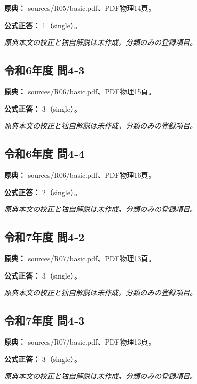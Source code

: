 \noindent\textbf{原典：} sources/R05/basic.pdf、PDF物理14頁。

\textbf{公式正答：} 1（single）。

\par\textit{原典本文の校正と独自解説は未作成。分類のみの登録項目。}

\subsection{令和6年度 問4-3}
\label{q:r06-reg-basic-4-3}

\noindent\textbf{原典：} sources/R06/basic.pdf、PDF物理15頁。

\textbf{公式正答：} 3（single）。

\par\textit{原典本文の校正と独自解説は未作成。分類のみの登録項目。}

\subsection{令和6年度 問4-4}
\label{q:r06-reg-basic-4-4}

\noindent\textbf{原典：} sources/R06/basic.pdf、PDF物理16頁。

\textbf{公式正答：} 2（single）。

\par\textit{原典本文の校正と独自解説は未作成。分類のみの登録項目。}

\subsection{令和7年度 問4-2}
\label{q:r07-reg-basic-4-2}

\noindent\textbf{原典：} sources/R07/basic.pdf、PDF物理13頁。

\textbf{公式正答：} 3（single）。

\par\textit{原典本文の校正と独自解説は未作成。分類のみの登録項目。}

\subsection{令和7年度 問4-3}
\label{q:r07-reg-basic-4-3}

\noindent\textbf{原典：} sources/R07/basic.pdf、PDF物理13頁。

\textbf{公式正答：} 3（single）。

\par\textit{原典本文の校正と独自解説は未作成。分類のみの登録項目。}
